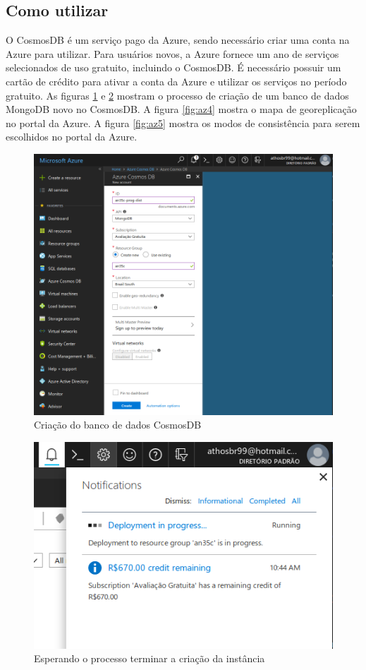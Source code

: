 \documentclass[12pt]{article}
\begin{document}
\subsection{Como utilizar}
O CosmosDB é um serviço pago da Azure, sendo necessário criar uma conta na Azure para utilizar. Para usuários novos, a Azure fornece um ano de serviços selecionados de uso gratuito, incluindo o CosmosDB. É necessário possuir um cartão de crédito
para ativar a conta da Azure e utilizar os serviços no período gratuito. As figuras \ref{fig:az1} e \ref{fig:az2} mostram o processo de criação de um banco de dados MongoDB novo no CosmosDB. A figura \ref{fig:az4} mostra o mapa de 
georeplicação no portal da Azure. A figura \ref{fig:az5} mostra os modos de consistência para serem escolhidos no portal da Azure.

\begin{figure}[H]
	\label{fig:az1}
	\caption{Criação do banco de dados CosmosDB} 
	\includegraphics[scale=0.42]{img/az1.png}
	\centering
\end{figure}

\begin{figure}[H]
	\label{fig:az2}
	\caption{Esperando o processo terminar a criação da instância}
	\includegraphics[scale=0.45]{img/az2.png}
	\centering
\end{figure}
\end{document}
